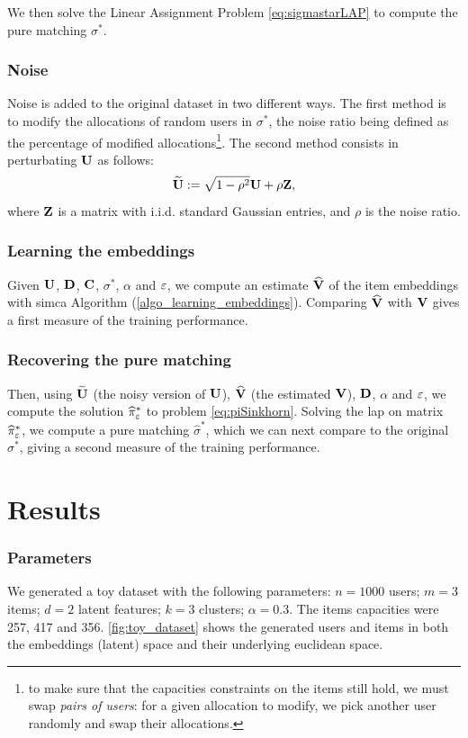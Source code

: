 We then solve the Linear Assignment Problem \eqref{eq:sigmastarLAP} to compute the pure matching $\sigma^*$.

\subsubsection*{Noise}
Noise is added to the original dataset in two different ways. The first method is to modify the allocations of random users in $\sigma^*$, the noise ratio being defined as the percentage of modified allocations\footnote{to make sure that the capacities constraints on the items still hold, we must swap \emph{pairs of users}: for a given allocation to modify, we pick another user randomly and swap their allocations.}. The second method consists in perturbating $\mathbf{U}$ as follows:
\begin{equation*}
    \widetilde{\mathbf{U}} := \sqrt{1-\rho^2} \mathbf{U} + \rho \mathbf{Z},
\end{equation*} where $\mathbf{Z}$ is a matrix with i.i.d. standard Gaussian entries, and $\rho$ is the noise ratio.

\subsubsection*{Learning the embeddings}
Given $\mathbf{U}$, $\mathbf{D}$, $\mathbf{C}$, $\sigma^*$, $\alpha$ and $\varepsilon$, we compute an estimate $\widehat{\mathbf{V}}$ of the item embeddings with \ac{simca} Algorithm (\cref{algo_learning_embeddings}). Comparing $\widehat{\mathbf{V}}$ with $\mathbf{V}$ gives a first measure of the training performance.

\subsubsection*{Recovering the pure matching}
Then, using $\widetilde{\mathbf{U}}$ (the noisy version of $\mathbf{U}$), $\widehat{\mathbf{V}}$ (the estimated $\mathbf{V}$), $\mathbf{D}$, $\alpha$ and $\varepsilon$, we compute the solution $\widehat{\pi}^*_{\varepsilon}$ to problem \eqref{eq:piSinkhorn}. Solving the \ac{lap} on matrix $\widehat{\pi}^*_{\varepsilon}$, we compute a pure matching $\widehat{\sigma}^*$, which we can next compare to the original ${\sigma}^*$, giving a second measure of the training performance.

\section{Results}

\subsubsection*{Parameters}
We generated a toy dataset with the following parameters: $n=1000$ users; $m=3$ items; $d=2$ latent features; $k=3$ clusters; $\alpha=0.3$. The items capacities were 257, 417 and 356. \cref{fig:toy_dataset} shows the generated users and items in both the embeddings (latent) space and their underlying euclidean space.

